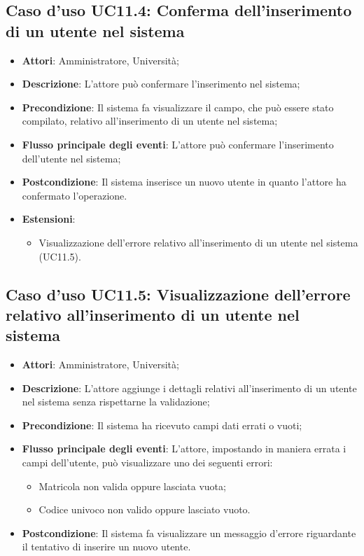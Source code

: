 \subsection{Caso d'uso \texorpdfstring{UC11.4}{UC11.4}: Conferma dell'inserimento di un utente nel sistema}
\begin{itemize}
	\item \textbf{Attori}: Amministratore, Università;
	\item \textbf{Descrizione}: L'attore può confermare l'inserimento nel sistema;
	\item \textbf{Precondizione}: Il sistema fa visualizzare il campo, che può essere stato compilato, relativo all'inserimento di un utente nel sistema;
	\item \textbf{Flusso principale degli eventi}: L'attore può confermare l'inserimento dell'utente nel sistema;
	\item \textbf{Postcondizione}: Il sistema inserisce un nuovo utente in quanto l'attore ha confermato l'operazione.
	
	\item \textbf{Estensioni}:
	\begin{itemize}
		\item Visualizzazione dell'errore relativo all'inserimento di un utente nel sistema (UC11.5).
	\end{itemize}
\end{itemize}
\subsection{Caso d'uso \texorpdfstring{UC11.5}{UC11.5}: Visualizzazione dell'errore relativo all'inserimento di un utente nel sistema}
\begin{itemize}
	\item \textbf{Attori}: Amministratore, Università;
	\item \textbf{Descrizione}: L'attore aggiunge i dettagli relativi all'inserimento di un utente nel sistema senza rispettarne la validazione;
	\item \textbf{Precondizione}: Il sistema ha ricevuto campi dati errati o vuoti;
	
	
	\item \textbf{Flusso principale degli eventi}: L'attore, impostando in maniera errata i campi dell'utente, può visualizzare uno dei seguenti errori:
	\begin{itemize}
		\item Matricola non valida oppure lasciata vuota;
		\item Codice univoco non valido oppure lasciato vuoto.
	\end{itemize}
	\item \textbf{Postcondizione}: Il sistema fa visualizzare un messaggio d'errore riguardante il tentativo di inserire un nuovo utente.
	
\end{itemize}
